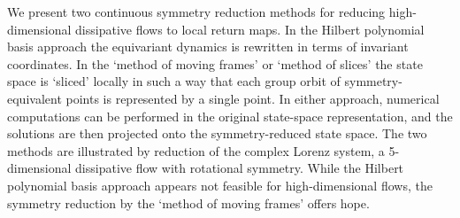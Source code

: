 We present two continuous symmetry reduction methods for
reducing high-dimensional dissipative flows to local return
maps. In the Hilbert polynomial basis approach the equivariant
dynamics is rewritten in terms of invariant coordinates. In the
`method of moving frames' or `method of slices' the state space
is `sliced' locally in such a way that each group orbit of
symmetry-equivalent points is represented by a single point. In
either approach, numerical computations can be performed in the
original state-space representation, and the solutions are then
projected onto the symmetry-reduced state space. The two methods
are illustrated by reduction of the complex Lorenz system, a
5-dimensional dissipative flow with rotational symmetry. While
the Hilbert polynomial basis approach appears not feasible for
high-dimensional flows, the symmetry reduction by the `method of
moving frames' offers hope.
